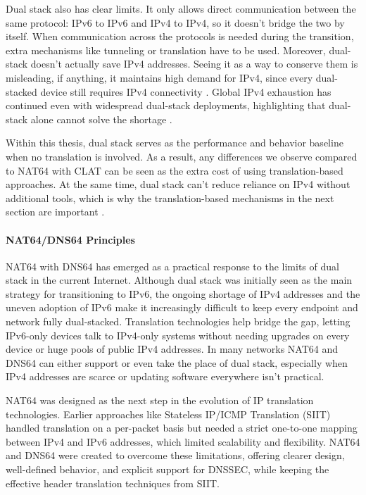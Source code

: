 Dual stack also has clear limits. It only allows direct communication between the same protocol: IPv6 to IPv6 and IPv4 to IPv4, so it doesn't bridge the two by itself. When communication across the protocols is needed during the transition, extra mechanisms like tunneling or translation have to be used\cite{punithavathani2009ipv4}. Moreover, dual-stack doesn’t actually save IPv4 addresses. Seeing it as a way to conserve them is misleading, if anything, it maintains high demand for IPv4, since every dual-stacked device still requires IPv4 connectivity\cite{rfc4241} . Global IPv4 exhaustion has continued even with widespread dual-stack deployments, highlighting that dual-stack alone cannot solve the shortage \cite{LEVIN20141059}.

Within this thesis, dual stack serves as the performance and behavior baseline when no translation is involved. As a result, any differences we observe compared to NAT64 with CLAT can be seen as the extra cost of using translation-based approaches. At the same time, dual stack can’t reduce reliance on IPv4 without additional tools, which is why the translation-based mechanisms in the next section are important \cite{punithavathani2009ipv4,LEVIN20141059}.

\paragraph{NAT64/DNS64 Principles} 


NAT64 with DNS64 has emerged as a practical response to the limits of dual stack in the current Internet\cite{rfc7269}. Although dual stack was initially seen as the main strategy for transitioning to IPv6, the ongoing shortage of IPv4 addresses and the uneven adoption of IPv6 make it increasingly difficult to keep every endpoint and network fully dual-stacked\cite{rfc7269}. Translation technologies help bridge the gap, letting IPv6-only devices talk to IPv4-only systems without needing upgrades on every device or huge pools of public IPv4 addresses. In many networks NAT64 and DNS64 can either support or even take the place of dual stack, especially when IPv4 addresses are scarce or updating software everywhere isn’t practical\cite{6231295}.

NAT64 was designed as the next step in the evolution of IP translation technologies. Earlier approaches like Stateless IP/ICMP Translation (SIIT) handled translation on a per-packet basis but needed a strict one-to-one mapping between IPv4 and IPv6 addresses, which limited scalability and flexibility\cite{rfc6146}. NAT64 and DNS64 were created to overcome these limitations, offering clearer design, well-defined behavior, and explicit support for DNSSEC, while keeping the effective header translation techniques from SIIT\cite{6231295}.

